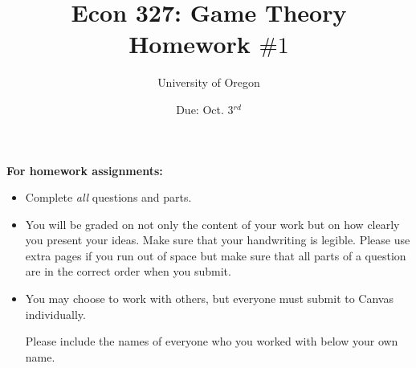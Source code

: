 \documentclass[addpoints]{exam}
\title{
    \textbf{Econ 327: Game Theory} \\ 
    Homework $\#1$
    }
\author{University of Oregon}
\date{Due: Oct. 3$^{rd}$}
\begin{document}
\maketitle

\begin{center}
  \gradetable[h][questions]
\end{center}

\vspace{0.5in}

\begin{center}
  \textbf{For homework assignments:}
\end{center}

\begin{itemize}


  \item Complete \textit{all} questions and parts.


  \item You will be graded on not only the content of your work
    but on how clearly you present your ideas.
    Make sure that your handwriting is legible.
    Please use extra pages if you run out of space 
    but make sure that all parts of a question 
    are in the correct order when you submit.

  \item You may choose to work with others,
  but everyone must submit to Canvas individually.

  Please include the names of everyone who you worked with 
  below your own name.
 
\end{itemize}

\vspace{1.0in}


\vspace{0.5in}

\end{document}
